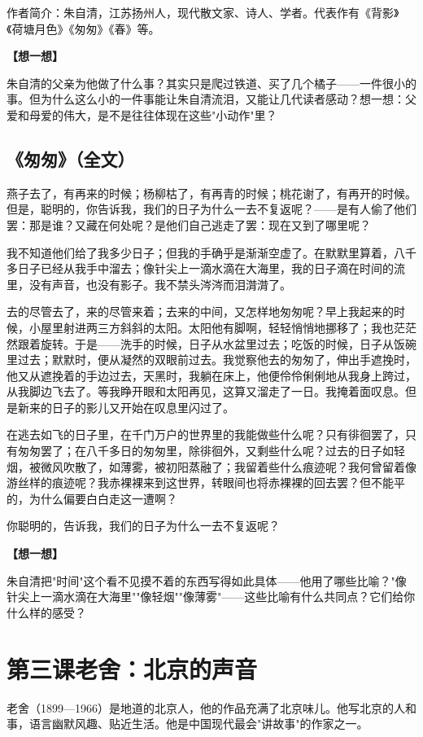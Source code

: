 \documentclass[a4paper,12pt]{ctexart}
\newcommand{\thinkq}{\vspace{0.2cm}\noindent\textcolor{orange!60!black}{\small\bfseries【想一想】}\par}
\newcommand{\authorinfo}[1]{{\vspace{0.1cm}\noindent\textcolor{blue!60!black}{\small #1}\par}}
\begin{document}
\authorinfo{作者简介：朱自清，江苏扬州人，现代散文家、诗人、学者。代表作有《背影》《荷塘月色》《匆匆》《春》等。}

\thinkq 朱自清的父亲为他做了什么事？其实只是爬过铁道、买了几个橘子——一件很小的事。但为什么这么小的一件事能让朱自清流泪，又能让几代读者感动？想一想：父爱和母爱的伟大，是不是往往体现在这些"小动作"里？

\subsection*{《匆匆》（全文）}

燕子去了，有再来的时候；杨柳枯了，有再青的时候；桃花谢了，有再开的时候。但是，聪明的，你告诉我，我们的日子为什么一去不复返呢？——是有人偷了他们罢：那是谁？又藏在何处呢？是他们自己逃走了罢：现在又到了哪里呢？

我不知道他们给了我多少日子；但我的手确乎是渐渐空虚了。在默默里算着，八千多日子已经从我手中溜去；像针尖上一滴水滴在大海里，我的日子滴在时间的流里，没有声音，也没有影子。我不禁头涔涔而泪潸潸了。

去的尽管去了，来的尽管来着；去来的中间，又怎样地匆匆呢？早上我起来的时候，小屋里射进两三方斜斜的太阳。太阳他有脚啊，轻轻悄悄地挪移了；我也茫茫然跟着旋转。于是——洗手的时候，日子从水盆里过去；吃饭的时候，日子从饭碗里过去；默默时，便从凝然的双眼前过去。我觉察他去的匆匆了，伸出手遮挽时，他又从遮挽着的手边过去，天黑时，我躺在床上，他便伶伶俐俐地从我身上跨过，从我脚边飞去了。等我睁开眼和太阳再见，这算又溜走了一日。我掩着面叹息。但是新来的日子的影儿又开始在叹息里闪过了。

在逃去如飞的日子里，在千门万户的世界里的我能做些什么呢？只有徘徊罢了，只有匆匆罢了；在八千多日的匆匆里，除徘徊外，又剩些什么呢？过去的日子如轻烟，被微风吹散了，如薄雾，被初阳蒸融了；我留着些什么痕迹呢？我何曾留着像游丝样的痕迹呢？我赤裸裸来到这世界，转眼间也将赤裸裸的回去罢？但不能平的，为什么偏要白白走这一遭啊？

你聪明的，告诉我，我们的日子为什么一去不复返呢？

\thinkq 朱自清把"时间"这个看不见摸不着的东西写得如此具体——他用了哪些比喻？"像针尖上一滴水滴在大海里""像轻烟""像薄雾"——这些比喻有什么共同点？它们给你什么样的感受？

\newpage

\section{\textcolor{orange!80!black}{第三课\quad 老舍：北京的声音}}

老舍（1899—1966）是地道的北京人，他的作品充满了北京味儿。他写北京的人和事，语言幽默风趣、贴近生活。他是中国现代最会"讲故事"的作家之一。
\end{document}
